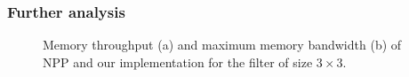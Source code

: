 \subsubsection{Further analysis}
\begin{figure}[t!]
\centering


	
\caption{Memory throughput (a) and maximum memory bandwidth (b) of NPP and our implementation for the filter of size $3 \times 3$.}
\label{fig:2dmemanaly}
\vspace{-5mm}
\end{figure}

